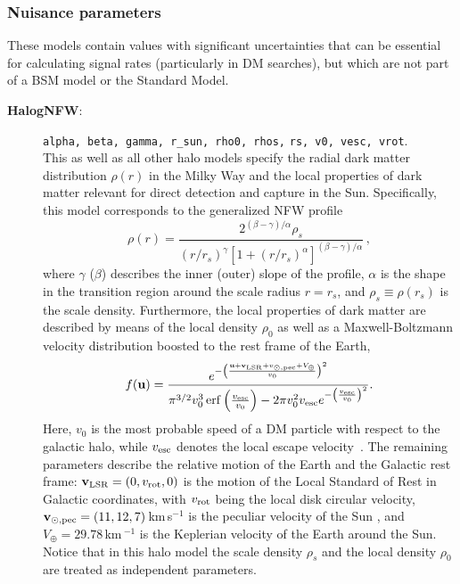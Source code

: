 \documentclass[pdftex,twocolumn,epjc3_preprint,runningheads]{svjour3}
\renewcommand{\_}{\discretionary{\underscore}{}{\underscore}}
\newcommand\term[1]{{\lstset{style=terminal}\lstinline!#1!\lstset{style=cpp}}}
\DeclareMathOperator\erf{erf}
\begin{document}
\subsubsection{Nuisance parameters}

These models contain values with significant uncertainties that can be essential for calculating signal rates (particularly in DM searches), but which are not part of a BSM model or the Standard Model.

\begin{description}

\item[\textbf{\textsf{Halo\_gNFW}}\label{Halo_gNFW}:] \term{alpha, beta, gamma, r_sun, rho0, rhos,}
                                                      \term{rs, v0, vesc, vrot}.\\
This as well as all other halo models specify the radial dark matter distribution $\rho(r)$ in the Milky Way and the local properties of dark matter relevant for direct detection and capture in the Sun. Specifically, this model corresponds to the generalized NFW profile
\begin{equation}
\rho(r) = \frac{2^{(\beta - \gamma)/\alpha} \rho_s}{(r/r_s)^\gamma \left[1 + (r/r_s)^\alpha \right]^{(\beta - \gamma) / \alpha}} \, ,
\label{eqn:gNFW}
\end{equation}
where $\gamma$ ($\beta$) describes the inner (outer) slope of the profile, $\alpha$ is the shape in the transition region around the scale radius $r=r_s$, and $\rho_s \equiv \rho(r_s)$ is the scale density. Furthermore, the local properties of dark matter are described by means of the local density $\rho_0$ as well as a Maxwell-Boltzmann velocity distribution boosted to the rest frame of the Earth,
\begin{equation}
\label{fv}
f(\mathbf{u}) = \frac{e^{-\left(\frac{\mathbf{u}+\mathbf{v}_{\rm LSR} + v_{\rm \odot, pec} + V_\oplus}{v_0}\right)^2}}{\pi^{3/2} v_0^3\erf \left(\frac{v_{\rm esc}}{v_0} \right) - 2\pi v_0^2 v_{\rm esc} e^{-\left(\frac{v_{\rm esc}}{v_0}\right)^2}}.
\end{equation}
Here, $v_0$ is the most probable speed of a DM particle with respect to the galactic halo, while $v_{\rm esc}$ denotes the local escape velocity~\cite{Akrami:2010dn}. The remaining parameters describe the relative motion of the Earth and the Galactic rest frame: $\mathbf{v}_{\rm LSR} = (0, v_{\rm rot}, 0)$ is the motion of the Local Standard of Rest in Galactic coordinates, with $v_{\rm rot}$ being the local disk circular velocity, $\mathbf{v}_{\rm \odot, pec} = (11, 12, 7)$\,km\,s$^{-1}$ is the peculiar velocity of the Sun \cite{Schoenrich:2009bx}, and $V_\oplus = 29.78$\,km\,$^{-1}$ is the Keplerian velocity of the Earth around the Sun. Notice that in this halo model the scale density $\rho_s$ and the local density $\rho_0$ are treated as independent parameters.


\end{description}
\end{document}
